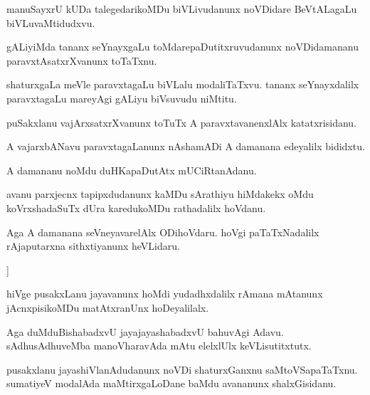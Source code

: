 \documentclass{article}
\begin{document}
\begin{mn}%
manuSayxrU kUDa talegedarikoMDu biVLivudanunx noVDidare BeVtALagaLu biVLuvaMtidudxvu.
\end{mn}

\begin{mn}%
gALiyiMda tananx seYnayxgaLu toMdarepaDutitxruvudanunx noVDidamananu paravxtAsatxrXvanunx 
toTaTxnu.
\end{mn}

\begin{mn}%
shaturxgaLa meVle paravxtagaLu biVLalu modaliTaTxvu. tananx seYnayxdalilx paravxtagaLu 
mareyAgi gALiyu biVsuvudu niMtitu.
\end{mn}

\begin{mn}%
puSakxlanu vajArxsatxrXvanunx toTuTx A paravxtavanenxlAlx katatxrisidanu.
\end{mn}

\begin{mn}%
A vajarxbANavu paravxtagaLanunx nAshamADi A damanana edeyalilx bididxtu.
\end{mn}

\begin{mn}%
A damananu noMdu duHKapaDutAtx mUCiRtanAdanu. 
\end{mn}

\begin{mn}%
avanu parxjecnx tapipxdudanunx kaMDu sArathiyu hiMdakekx oMdu koVrxshadaSuTx dUra 
karedukoMDu rathadalilx hoVdanu.
\end{mn}

\begin{mn}%
Aga A damanana seVneyavarelAlx ODihoVdaru. hoVgi paTaTxNadalilx rAjaputarxna sithxtiyanunx 
heVLidaru.
\end{mn}]

\begin{mn}%
hiVge pusakxLanu jayavanunx hoMdi yudadhxdalilx rAmana mAtanunx jAcnxpisikoMDu matAtxranUnx 
hoDeyalilalx.
\end{mn}

\begin{mn}%
Aga duMduBishabadxvU jayajayashabadxvU bahuvAgi Adavu. sAdhusAdhuveMba manoVharavAda mAtu 
elelxlUlx keVLisutitxtutx.
\end{mn}

\begin{mn}%
pusakxlanu jayashiVlanAdudanunx noVDi shaturxGanxnu saMtoVSapaTaTxnu. sumatiyeV modalAda 
maMtirxgaLoDane baMdu avananunx shalxGisidanu.
\end{mn}
\end{document}
